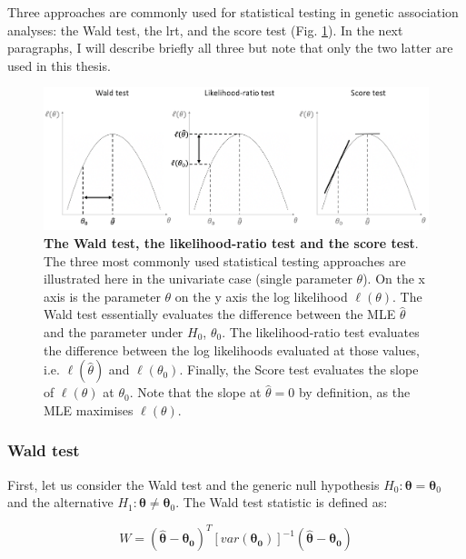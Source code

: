 
\vspace{5mm}

Three approaches are commonly used for statistical testing in genetic association analyses: the Wald test, the \gls{lrt}, and the score test     (Fig. \ref{fig:hypothesis_tests}).
In the next paragraphs, I will describe briefly all three but note that only the two latter are used in this thesis.

\begin{figure}[h]
\centering
\includegraphics[width=15cm]{Chapter2/Fig/wald_lrt_score_tests.png}
\caption[\textbf{Wald, LRT and score test}]{\textbf{The Wald test, the likelihood-ratio test and the score test}.\\
The three most commonly used statistical testing approaches are illustrated here in the univariate case (single parameter $\theta$). 
On the x axis is the parameter $\theta$ on the y axis the log likelihood $\ell(\theta)$.
The Wald test essentially evaluates the difference between the MLE $\hat{\theta}$ and the parameter under $H_0$, $\theta_0$.
The likelihood-ratio test evaluates the difference between the log likelihoods evaluated at those values, i.e. $\ell(\hat{\theta})$ and $\ell(\theta_0)$.
Finally, the Score test evaluates the slope of $\ell(\theta)$ at $\theta_0$. Note that the slope at $\hat{\theta}=0$ by definition, as the MLE maximises $\ell(\theta)$.}
\label{fig:hypothesis_tests}
\end{figure}

\subsubsection{Wald test}

First, let us consider the Wald test and the generic null hypothesis $H_0: \boldsymbol{\theta} = \boldsymbol{\theta}_0$ and the alternative $H_1: \boldsymbol{\theta} \neq \boldsymbol{\theta}_0$.
The Wald test statistic is defined as:

\begin{equation}\label{eq:Wald_test}
W = (\hat{\boldsymbol{\theta}}-\boldsymbol{\theta_0})^T [var(\boldsymbol{\theta_0})]^{-1}(\hat{\boldsymbol{\theta}}-\boldsymbol{\theta_0}) 
\end{equation}

